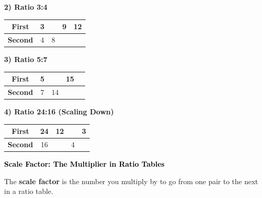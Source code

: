 \documentclass[12pt, letterpaper, fleqn]{article}
\begin{document}
\noindent
\textbf{2) Ratio 3:4}

\begin{center}
\begin{tabular}{|c|c|c|c|c|}
\hline
\textbf{First} & 3 & \phantom{0} & 9 & 12 \\
\hline
\textbf{Second} & 4 & 8 & \phantom{0} & \phantom{0} \\
\hline
\end{tabular}
\end{center}



\noindent
\textbf{3) Ratio 5:7}

\begin{center}
\begin{tabular}{|c|c|c|c|c|}
\hline
\textbf{First} & 5 & \phantom{0} & 15 & \phantom{0} \\
\hline
\textbf{Second} & 7 & 14 & \phantom{0} & \phantom{0} \\
\hline
\end{tabular}
\end{center}



\noindent
\textbf{4) Ratio 24:16 (Scaling Down)}

\begin{center}
\begin{tabular}{|c|c|c|c|c|}
\hline
\textbf{First} & 24 & 12 & \phantom{0} & 3 \\
\hline
\textbf{Second} & 16 & \phantom{0} & 4 & \phantom{0} \\
\hline
\end{tabular}
\end{center}

\vspace{4mm}


\begin{tcolorbox}[colback=customteal!20]
\large\textcolor{black}{\textbf{Scale Factor: The Multiplier in Ratio Tables}}
\end{tcolorbox}

\noindent
The \textbf{scale factor} is the number you multiply by to go from one pair to the next in a ratio table.
\end{document}
